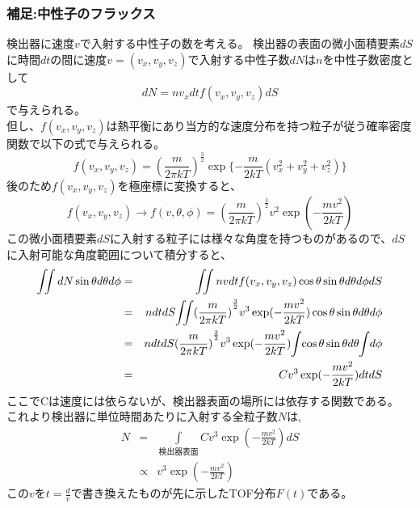 \subsubsection{補足:中性子のフラックス}
検出器に速度$v$で入射する中性子の数を考える。
検出器の表面の微小面積要素$dS$に時間$dt$の間に速度$v=(v_x,v_y,v_z)$で入射する中性子数$dN$は$n$を中性子数密度として
\begin{equation}
dN=nv_xdtf(v_x,v_y,v_z)dS
\end{equation}
で与えられる。\\
但し、$f(v_x,v_y,v_z)$は熱平衡にあり当方的な速度分布を持つ粒子が従う確率密度関数で以下の式で与えられる。
\begin{equation}
f(v_x,v_y,v_z)={(\frac{m}{2\pi kT})}^{\frac{3}{2}}\exp\{-\frac{m}{2kT}(v^2_x+v^2_y+v^2_z)\} 
\end{equation}
後のため$f(v_x,v_y,v_z)$を極座標に変換すると、
\begin{equation}
f(v_x,v_y,v_z) \rightarrow f(v,\theta,\phi)={(\frac{m}{2\pi kT})}^{\frac{3}{2}}v^2\exp(-\frac{mv^2}{2kT})
\end{equation}
この微小面積要素$dS$に入射する粒子には様々な角度を持つものがあるので、$dS$に入射可能な角度範囲について積分すると、
\begin{eqnarray*}
 \iint dN\sin\theta d\theta d\phi &=&\iint nvdtf(v_x,v_y,v_z)\cos\theta \sin\theta d\theta d\phi dS \\ 
&=&ndtdS \hspace{-2pt}\iint \hspace{-2pt}{(\frac{m}{2\pi kT})}^{\frac{3}{2}}v^3\exp(-\frac{mv^2}{2kT})\cos\theta \sin\theta d\theta d\phi  \\
&=&ndtdS{(\frac{m}{2\pi kT})}^{\frac{3}{2}} v^3\exp(-\frac{mv^2}{2kT}) \hspace{-2pt}\int \hspace{-2pt}\cos\theta\sin\theta d\theta \hspace{-2pt}\int \hspace{-2pt} d\phi \\
&=&Cv^3\exp(-\frac{mv^2}{2kT})dtdS
\end{eqnarray*}
ここでCは速度には依らないが、検出器表面の場所には依存する関数である。
これより検出器に単位時間あたりに入射する全粒子数$N$は,
\begin{eqnarray*}
N &=&
\int\limits_{\text{} 検出器表面}Cv^3\exp(-\frac{mv^2}{2kT})dS \\
&\propto& v^3\exp(-\frac{mv^2}{2kT})
\end{eqnarray*}
この$v$を$t=\frac{d}{v}$で書き換えたものが先に示したTOF分布$F(t)$である。
\newpage
